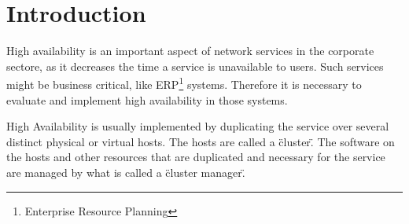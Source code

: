 \section{Introduction}

High availability is an important aspect of network services in the corporate
sectore, as it decreases the time a service is unavailable to users.
Such services might be business critical, like ERP\footnote{Enterprise Resource Planning} systems.
Therefore it is necessary to evaluate and implement high availability in those systems.

High Availability is usually implemented by duplicating the service over several distinct physical or
virtual hosts. The hosts are called a \"cluster\". The software on the hosts and other resources
that are duplicated and necessary for the service are managed by what is called a \"cluster manager\".